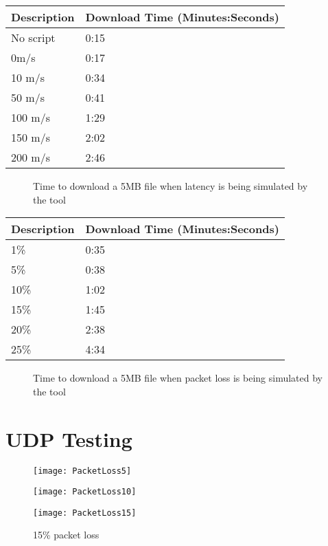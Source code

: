 \begin{appendices}
\begin{center}
\begin{tabular}{| l | l |}
	\hline
	{\bf Description} 	& {\bf Download Time (Minutes:Seconds)} \\\hline
	No script			& 0:15 \\\hline
	0m/s				& 0:17 \\\hline
	10 	m/s				& 0:34 \\\hline
	50 	m/s				& 0:41 \\\hline
	100 m/s				& 1:29 \\\hline
	150 m/s				& 2:02 \\\hline
	200 m/s				& 2:46 \\\hline
		
\end{tabular}
\begin{figure}[h]
		\caption{Time to download a 5MB file when latency is being simulated by the tool}
	\end{figure}	

\begin{tabular}{| l | l |}
	\hline
	{\bf Description} 	& {\bf Download Time (Minutes:Seconds)} \\\hline
	1\%					& 0:35 \\\hline
	5\%					& 0:38 \\\hline
	10\%				& 1:02 \\\hline
	15\%				& 1:45 \\\hline
	20\%				& 2:38 \\\hline
	25\%				& 4:34 \\\hline
\end{tabular}
\begin{figure}[h]
		\caption{Time to download a 5MB file when packet loss is being simulated by the tool}
\end{figure}	
\end{center}

%
\chapter{UDP Testing}
\label{ref:udpTesting}
\newcommand{\udpScale}{0.5}
\newcommand{\figureText}[1]{#1\% packet loss}

\begin{figure}[!htb]
  \texttt{[image: PacketLoss5]}
  \caption{\figureText{5}}
\endminipage\hfill
{}
  \texttt{[image: PacketLoss10]}
  \caption{\figureText{10}}
\endminipage\hfill
{}
  \texttt{[image: PacketLoss15]}
  \caption{\figureText{15}}
\endminipage
\end{figure}


\end{appendices}
